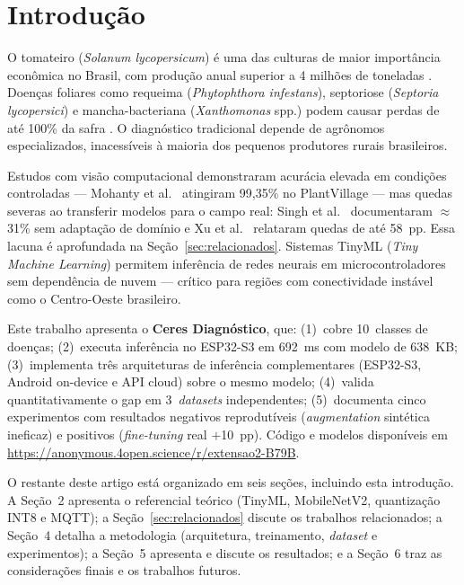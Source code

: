 \documentclass[12pt]{article}
\begin{document}
\section{Introdução}

O tomateiro (\textit{Solanum lycopersicum}) é uma das culturas de maior importância
econômica no Brasil, com produção anual superior a 4 milhões de toneladas
\cite{fao2024}. Doenças foliares como requeima (\textit{Phytophthora infestans}),
septoriose (\textit{Septoria lycopersici}) e mancha-bacteriana (\textit{Xanthomonas}
spp.) podem causar perdas de até 100\% da safra \cite{embrapa2023}. O diagnóstico
tradicional depende de agrônomos especializados, inacessíveis à maioria dos pequenos
produtores rurais brasileiros.

Estudos com visão computacional demonstraram acurácia elevada em condições
controladas --- Mohanty et al.~\cite{mohanty2016} atingiram 99,35\% no PlantVillage
--- mas quedas severas ao transferir modelos para o campo real: Singh et
al.~\cite{singh2020} documentaram $\approx$31\% sem adaptação de domínio e Xu et
al.~\cite{xu2024} relataram quedas de até 58~pp. Essa lacuna é aprofundada na
Seção~\ref{sec:relacionados}. Sistemas TinyML (\textit{Tiny Machine Learning})
permitem inferência de redes neurais em microcontroladores sem dependência de nuvem
\cite{warden2019} --- crítico para regiões com conectividade instável como o
Centro-Oeste brasileiro.

Este trabalho apresenta o \textbf{Ceres Diagnóstico}, que: (1)~cobre 10~classes de
doenças; (2)~executa inferência no ESP32-S3 em 692~ms com modelo de 638~KB;
(3)~implementa três arquiteturas de inferência complementares (ESP32-S3, Android
on-device e API cloud) sobre o mesmo modelo; (4)~valida quantitativamente o gap em
3~\textit{datasets} independentes; (5)~documenta cinco experimentos com resultados
negativos reprodutíveis (\textit{augmentation} sintética ineficaz) e positivos
(\textit{fine-tuning} real $+$10~pp). Código e modelos disponíveis em
\url{https://anonymous.4open.science/r/extensao2-B79B}.

O restante deste artigo está organizado em seis seções, incluindo esta introdução.
A Seção~2 apresenta o referencial teórico (TinyML, MobileNetV2, quantização INT8 e
MQTT); a Seção~\ref{sec:relacionados} discute os trabalhos relacionados; a Seção~4
detalha a metodologia (arquitetura, treinamento, \textit{dataset} e experimentos);
a Seção~5 apresenta
e discute os resultados; e a Seção~6 traz as considerações finais e os trabalhos
futuros.
\end{document}
